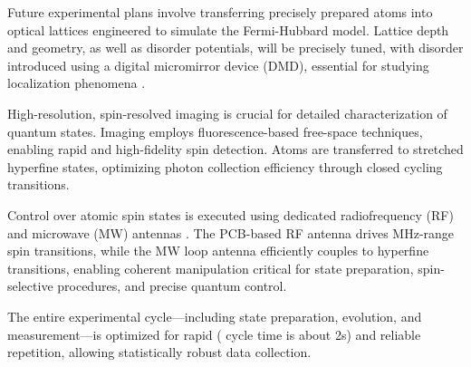 Future experimental plans involve transferring precisely prepared atoms into optical lattices engineered to simulate the Fermi-Hubbard model. Lattice depth and geometry, as well as disorder potentials, will be precisely tuned, with disorder introduced using a digital micromirror device (DMD), essential for studying localization phenomena \cite{huang_construction_2024}.

High-resolution, spin-resolved imaging is crucial for detailed characterization of quantum states. Imaging employs fluorescence-based free-space techniques, enabling rapid and high-fidelity spin detection. Atoms are transferred to stretched hyperfine states, optimizing photon collection efficiency through closed cycling transitions.

Control over atomic spin states is executed using dedicated radiofrequency (RF) and microwave (MW) antennas
. 
The PCB-based RF antenna 
drives MHz-range spin transitions, while the MW loop antenna 
efficiently couples to hyperfine transitions, enabling coherent manipulation critical for state preparation, spin-selective procedures, and precise quantum control.

The entire experimental cycle—including state preparation, evolution, and measurement—is optimized for rapid ( cycle time is about 2s) and reliable repetition, allowing statistically robust data collection. 